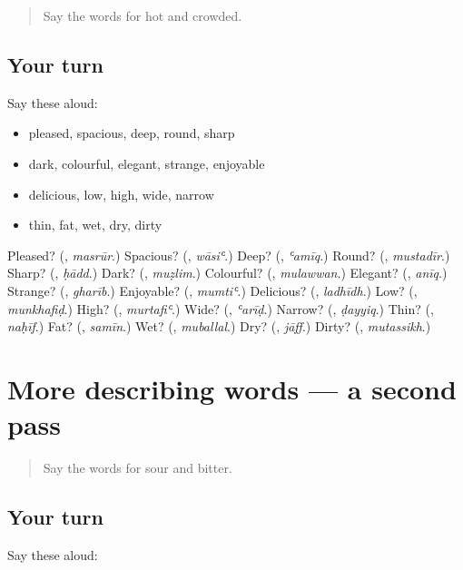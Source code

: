 \begin{quote}
Say the words for hot and crowded.
\end{quote}

\subsection*{Your turn}
Say these aloud:

\begin{itemize}
\raggedright
  \item pleased, spacious, deep, round, sharp
  \item dark, colourful, elegant, strange, enjoyable
  \item delicious, low, high, wide, narrow
  \item thin, fat, wet, dry, dirty
\end{itemize}

\begin{tcolorbox}[breakable,colback=teal!4,colframe=teal!35!black,title={Before you move on}]
Pleased? (\textbf{}, \emph{masrūr}.) Spacious? (\textbf{}, \emph{wāsiʿ}.) Deep? (\textbf{}, \emph{ʿamīq}.) Round? (\textbf{}, \emph{mustadīr}.) Sharp? (\textbf{}, \emph{ḥādd}.) Dark? (\textbf{}, \emph{muẓlim}.) Colourful? (\textbf{}, \emph{mulawwan}.) Elegant? (\textbf{}, \emph{anīq}.) Strange? (\textbf{}, \emph{gharīb}.) Enjoyable? (\textbf{}, \emph{mumtiʿ}.) Delicious? (\textbf{}, \emph{ladhīdh}.) Low? (\textbf{}, \emph{munkhafiḍ}.) High? (\textbf{}, \emph{murtafiʿ}.) Wide? (\textbf{}, \emph{ʿarīḍ}.) Narrow? (\textbf{}, \emph{ḍayyiq}.) Thin? (\textbf{}, \emph{naḥīf}.) Fat? (\textbf{}, \emph{samīn}.) Wet? (\textbf{}, \emph{muballal}.) Dry? (\textbf{}, \emph{jāff}.) Dirty? (\textbf{}, \emph{mutassikh}.)
\end{tcolorbox}
\section[(dialogue)]{More describing words — a second pass}

\label{lesson:AR-R155-second-pass-more-describing-words}



\begin{quote}
Say the words for sour and bitter.
\end{quote}

\subsection*{Your turn}
Say these aloud:

